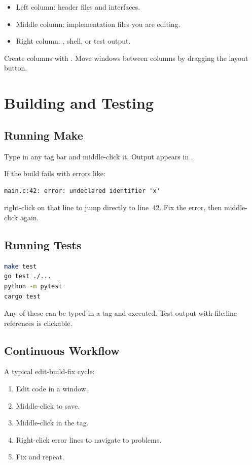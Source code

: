 \begin{itemize}
\item Left column: header files and interfaces.
\item Middle column: implementation files you are editing.
\item Right column: ,  shell, or test output.
\end{itemize}

Create columns with .  Move windows between columns by
dragging the layout button.

\section{Building and Testing}
\label{sec:building}

\subsection{Running Make}

Type  in any tag bar and middle-click it.  Output appears in
.

If the build fails with errors like:

\begin{Verbatim}[frame=single]
main.c:42: error: undeclared identifier 'x'
\end{Verbatim}

\noindent
right-click on that line to jump directly to  line~42.
Fix the error, then middle-click  again.

\subsection{Running Tests}

\begin{lstlisting}[language=bash]
make test
go test ./...
python -m pytest
cargo test
\end{lstlisting}

Any of these can be typed in a tag and executed.  Test output with
file:line references is clickable.

\subsection{Continuous Workflow}

A typical edit-build-fix cycle:

\begin{enumerate}
\item Edit code in a window.
\item Middle-click  to save.
\item Middle-click  in the tag.
\item Right-click error lines to navigate to problems.
\item Fix and repeat.
\end{enumerate}

